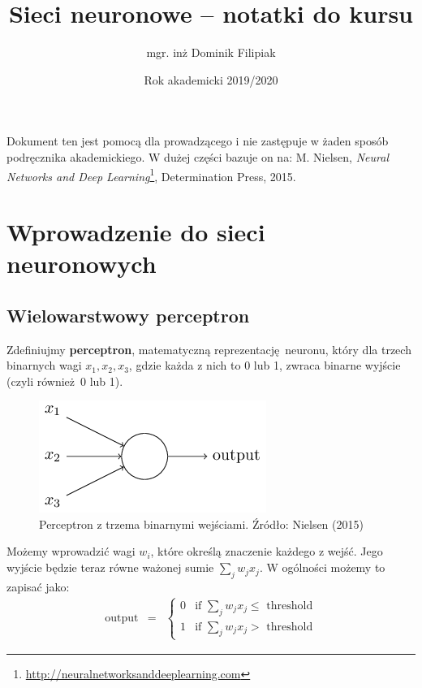 \documentclass[10pt, oneside]{article}
\title{Sieci neuronowe -- notatki do kursu}
\author{mgr. inż Dominik Filipiak}
\date{Rok akademicki 2019/2020}
\theoremstyle{remark}
\begin{document}
\maketitle
\tableofcontents

\vspace{.25in}

Dokument ten jest pomocą dla prowadzącego i nie zastępuje w żaden sposób podręcznika akademickiego.
W dużej części bazuje on na: M. Nielsen, \emph{Neural Networks and Deep Learning}\footnote{\url{http://neuralnetworksanddeeplearning.com}}, Determination Press, 2015.

\section{Wprowadzenie do sieci neuronowych}
\subsection{Wielowarstwowy perceptron}

Zdefiniujmy \textbf{perceptron}, matematyczną reprezentację neuronu, który dla trzech binarnych wagi $x_1, x_2, x_3$, gdzie każda z nich to 0 lub 1, zwraca binarne wyjście (czyli również 0 lub 1).
\begin{figure}[htpb]
	\centering
	\includegraphics[width=.3\linewidth]{figures/tikz0}
	\caption{Perceptron z trzema binarnymi wejściami. Źródło: Nielsen (2015)}
\end{figure}
Możemy wprowadzić wagi $w_i$, które określą znaczenie każdego z wejść.
Jego wyjście będzie teraz równe ważonej sumie $\sum_j w_j x_j$.
W ogólności możemy to zapisać jako:
\begin{eqnarray}
  \mbox{output} & = & \left\{ \begin{array}{ll}
      0 & \mbox{if } \sum_j w_j x_j \leq \mbox{ threshold} \\
      1 & \mbox{if } \sum_j w_j x_j > \mbox{ threshold}
      \end{array} \right.
\end{eqnarray}
\end{document}
